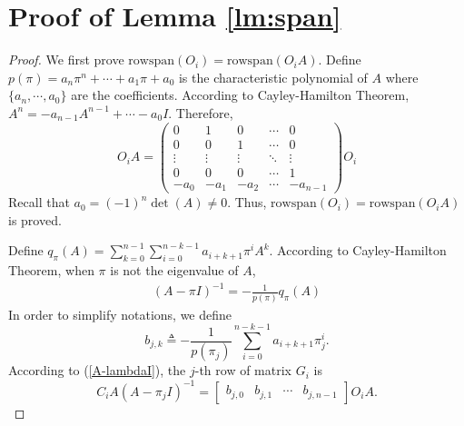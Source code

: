 \documentclass[12pt]{article}
\newcommand{\rs}{\text{rowspan}}
\newtheorem*{proof}{\textbf{Proof}}
\begin{document}
\section{Proof of Lemma \ref{lm:span}}
\begin{proof}
	We first prove $\rs(O_i)=\rs(O_i A)$. Define $p(\pi)=a_n \pi^n +\cdots+a_1 \pi +a_0$ is the characteristic polynomial of $A$ where $\{a_n,\cdots,a_0\}$ are the coefficients. 
	According to Cayley-Hamilton Theorem, $A^n=-a_{n-1}A^{n-1}+\cdots-a_0 I$. Therefore, 
	$$
	O_i A=
	\begin{pmatrix}
		0 & 1 & 0 &  \cdots & 0 \\
		0 & 0 & 1 &  \cdots & 0 \\
		\vdots & \vdots & \vdots & \ddots & \vdots \\
		0 & 0 & 0 &  \cdots & 1 \\
		-a_0 & -a_1 & -a_2 & \cdots &  -a_{n-1}
	\end{pmatrix}
	O_i
	$$
	Recall that $a_0=(-1)^n\det(A)\neq 0$. Thus, $\rs(O_i)=\rs(O_i A)$ is proved.
	
	Define $q_\pi(A)=\sum_{k=0}^{n-1} \sum_{i=0}^{n-k-1} a_{i+k+1} \pi^i A^k$. According to Cayley-Hamilton Theorem, when $\pi$ is not the eigenvalue of $A$,
	\begin{align}\label{A-lambdaI}
		(A-\pi I)^{-1}=-\frac{1}{p(\pi)} q_\pi(A)
	\end{align}
	In order to simplify notations, we define 
	\begin{equation}\label{eq:bjk}
	b_{j,k}\triangleq-\frac{1}{p(\pi_j)}\sum_{i=0}^{n-k-1} a_{i+k+1} \pi_j^i.
	\end{equation}
	According to (\ref{A-lambdaI}), the $j$-th row of matrix $G_i$ is
	$$C_{i} A\left(A-\pi_{j} I\right)^{-1}=
	\begin{bmatrix}
		b_{j,0} & b_{j,1} & \cdots  & b_{j,n-1} 
	\end{bmatrix} O_i A.$$
	

\end{proof}
\end{document}
